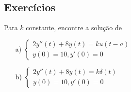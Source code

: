 \subsection*{Exercícios}
\begin{exer}
Para $k$ constante, encontre a solução de
\begin{itemize}
  \item[a)] $\displaystyle \left\{
                              \begin{array}{ll}
                                2y''(t) + 8 y(t) = k u(t-a) \\
                                y(0)=10, y'(0)=0
                              \end{array}
                            \right.
$
  \item[b)] $\displaystyle \left\{
                              \begin{array}{ll}
                                2y''(t) + 8 y(t) = k \delta(t) \\
                                y(0)=10, y'(0)=0
                              \end{array}
                            \right.
$
\end{itemize}
\end{exer}

